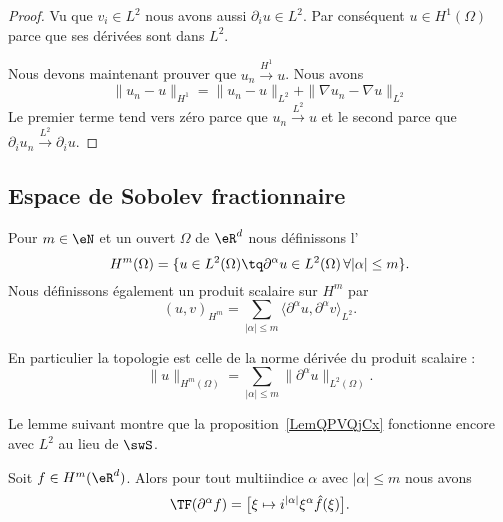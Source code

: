 \begin{proof}
	Vu que \( v_i\in L^2\) nous avons aussi \( \partial_iu\in L^2\). Par conséquent \( u\in H^1(\Omega)\) parce que ses dérivées sont dans \( L^2\).

	Nous devons maintenant prouver que \( u_n\stackrel{H^1}{\longrightarrow}u\). Nous avons
	\begin{equation}
		\| u_n-u \|_{H^1}=\| u_n -u\|_{L^2}+\| \nabla u_n-\nabla u \|_{L^2}
	\end{equation}
	Le premier terme tend vers zéro parce que \( u_n\stackrel{L^2}{\longrightarrow}u\) et le second parce que \( \partial_iu_n\stackrel{L^2}{\longrightarrow}\partial_iu\).
\end{proof}

\subsection{Espace de Sobolev fractionnaire}

\begin{definition}
	Pour \( m\in \eN\) et un ouvert \( \Omega\) de \( \eR^d\) nous définissons l'
	\begin{equation}
		H^m(\Omega)=\{ u\in L^2(\Omega)\tq \partial^{\alpha}u\in L^2(\Omega)\,\forall | \alpha |\leq m \}.
	\end{equation}
	Nous définissons également un produit scalaire sur \( H^m\) par
	\begin{equation}
		(u,v)_{H^m}=\sum_{| \alpha |\leq m}\langle \partial^{\alpha}u,  \partial^{\alpha}v  \rangle_{L^2}.
	\end{equation}
\end{definition}
En particulier la topologie est celle de la norme dérivée du produit scalaire :
\begin{equation}        \label{EQooMCWMooKKTqzM}
	\| u \|_{H^m(\Omega)}=\sum_{| \alpha |\leq m}\| \partial^{\alpha}u \|_{L^2(\Omega)}.
\end{equation}

Le lemme suivant montre que la proposition~\ref{LemQPVQjCx} fonctionne encore avec \( L^2\) au lieu de \( \swS\).
\begin{lemma} \label{LEMooAGBZooWCbPDd}
	Soit \( f\in H^m(\eR^d)\). Alors pour tout multiindice \( \alpha\) avec \( | \alpha |\leq m\) nous avons
	\begin{equation}
		\TF(\partial^{\alpha}f)=\big[ \xi\mapsto i^{| \alpha |}\xi^{\alpha}\hat f(\xi) \big].
	\end{equation}
\end{lemma}


